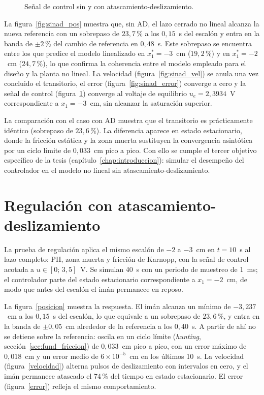 \begin{figure}[ht]
    \centering
    
    \caption[Sin AD: señal de control]{Señal de control sin y con atascamiento-deslizamiento.}
    \label{fig:sinad_ctrl}
\end{figure}

La figura~\ref{fig:sinad_pos} muestra que, sin AD, el lazo cerrado no lineal alcanza la nueva referencia con un sobrepaso de $23{,}7$\,\% a los $0{,}15$~s del escalón y entra en la banda de $\pm 2$\,\% del cambio de referencia en $0{,}48$~s. Este sobrepaso se encuentra entre los que predice el modelo linealizado en $x_1^*=-3$~cm ($19{,}2$\,\%) y en $x_1^*=-2$~cm ($24{,}7$\,\%), lo que confirma la coherencia entre el modelo empleado para el diseño y la planta no lineal. La velocidad (figura~\ref{fig:sinad_vel}) se anula una vez concluido el transitorio, el error (figura~\ref{fig:sinad_error}) converge a cero y la señal de control (figura~\ref{fig:sinad_ctrl}) converge al voltaje de equilibrio $u_e=2{,}3934$~V correspondiente a $x_1=-3$~cm, sin alcanzar la saturación superior.

La comparación con el caso con AD muestra que el transitorio es prácticamente idéntico (sobrepaso de $23{,}6$\,\%). La diferencia aparece en estado estacionario, donde la fricción estática y la zona muerta sustituyen la convergencia asintótica por un ciclo límite de $0{,}033$~cm pico a pico. Con ello se cumple el tercer objetivo específico de la tesis (capítulo~\ref{chap:introduccion}): simular el desempeño del controlador en el modelo no lineal sin atascamiento-deslizamiento.

\FloatBarrier

\section{Regulación con atascamiento-deslizamiento}
\label{sec:regulacion}

La prueba de regulación aplica el mismo escalón de $-2$ a $-3$~cm en $t=10$~s al lazo completo: PII, zona muerta y fricción de Karnopp, con la señal de control acotada a $u\in[0;\,3{,}5]$~V. Se simulan 40~s con un periodo de muestreo de 1~ms; el controlador parte del estado estacionario correspondiente a $x_1=-2$~cm, de modo que antes del escalón el imán permanece en reposo.

La figura~\ref{posicion} muestra la respuesta. El imán alcanza un mínimo de $-3{,}237$~cm a los $0{,}15$~s del escalón, lo que equivale a un sobrepaso de $23{,}6$\,\%, y entra en la banda de $\pm0{,}05$~cm alrededor de la referencia a los $0{,}40$~s. A partir de ahí no se detiene sobre la referencia: oscila en un ciclo límite (\emph{hunting}, sección~\ref{sec:fund_friccion}) de $0{,}033$~cm pico a pico, con un error máximo de $0{,}018$~cm y un error medio de $6\times10^{-5}$~cm en los últimos 10~s. La velocidad (figura~\ref{velocidad}) alterna pulsos de deslizamiento con intervalos en cero, y el imán permanece atascado el 74\,\% del tiempo en estado estacionario. El error (figura~\ref{error}) refleja el mismo comportamiento.

